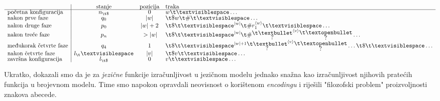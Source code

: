 \begin{equation}
\begin{array}{l|ccl}
                             &\text{stanje}&\text{pozicija}&\text{traka}\\\hline
    \text{početna konfiguracija} & n_{\t\$} & 0         & w\bl\ldots \\
\text{nakon prve faze}       & q_0 & \dulj w   & \t\$w\t\#\bl\ldots \\
\text{nakon druge faze}      & p_0 & \dulj w+2 & \t\$\bl^{\dulj w}\t\#r_1^{\kr w}\bl\ldots \\
\text{nakon treće faze}      & p_n & {}>\dulj w & \renewcommand{\arraystretch}{0.1}
    \t\$\bl^{\dulj w}\t\#\begin{array}{@{}c@{}}\t\textbullet\\?\end{array}^{\kr{v}}\begin{array}{@{}c@{}}\t\textopenbullet\\?\end{array}%
    \ldots\\
\text{međukorak četvrte faze} & q_4 & 1 & \renewcommand{\arraystretch}{0.1}\t\$\bl^{\dulj w+1}\begin{array}{@{}c@{}}\t\textbullet\\?\end{array}^{\kr v}\begin{array}{@{}c@{}}\t\textopenbullet\\?\end{array}\ldots\t\$\bl\ldots\\
\text{nakon četvrte faze}    %
& l_\bl & \dulj v & \t\$v\bl\ldots\\
    \text{završna konfiguracija} & l_{\t\$} & 0 & v\bl\ldots
\end{array}
\end{equation}

Ukratko, dokazali smo da je za \emph{jezične} funkcije izračunljivost u jezičnom modelu jednako snažna kao izračunljivost njihovih pratećih funkcija u brojevnom modelu. Time smo napokon opravdali neovisnost o korištenom \emph{encodingu} i riješili "filozofski problem" proizvoljnosti znakova abecede. %

